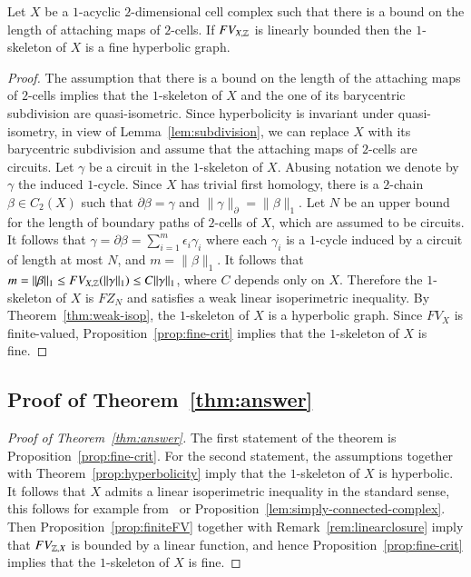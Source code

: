 \begin{corollary}\label{cor:suskey}
Let $X$ be a $1$-acyclic $2$-dimensional cell complex such that there is a bound on the length of  attaching maps of $2$-cells. If $FV_{X, \mathbb{Z}}$ is linearly bounded then the $1$-skeleton of $X$ is a fine hyperbolic graph.\end{corollary}
\begin{proof}
The assumption that there is a bound on the length of the attaching maps of $2$-cells implies that the $1$-skeleton of $X$ and the one of its barycentric subdivision are quasi-isometric. Since hyperbolicity is invariant under quasi-isometry, in view of Lemma~\ref{lem:subdivision},  we can replace $X$ with its  barycentric subdivision and assume that the attaching maps of $2$-cells are circuits.   Let $\gamma$ be a circuit in the $1$-skeleton of $X$. Abusing notation we denote by $\gamma$ the induced $1$-cycle.  Since $X$ has trivial first homology, there is a $2$-chain $\beta \in C_2(X)$ such that $\partial \beta =  \gamma$ and $\|\gamma\|_\partial = \|\beta\|_1$.  Let $N$ be an upper bound for the length of boundary paths of  $2$-cells of $X$, which are assumed to be circuits. It follows that $\gamma = \partial \beta = \sum_{i=1}^m \epsilon_i  \gamma_i$ where each $\gamma_i$ is a  $1$-cycle  induced by a circuit of length at most $N$, and $m=\|\beta\|_1$. It follows that 
$m=\|\beta\|_1 \leq FV_{X, \mathbb{Z}}(\|\gamma\|_1)\leq C \|\gamma\|_1$, 
where $C$ depends only on $X$. Therefore  the $1$-skeleton of $X$ is $FZ_N$ and satisfies a weak linear isoperimetric inequality. By Theorem~\ref{thm:weak-isop}, the  $1$-skeleton of $X$ is a hyperbolic graph.
Since $FV_X$ is finite-valued, Proposition~\ref{prop:fine-crit} implies that the $1$-skeleton of $X$ is fine.
\end{proof}





\subsection{Proof of  Theorem~\ref{thm:answer}}

\begin{proof}[Proof of Theorem~\ref{thm:answer}]
The first statement of the theorem is Proposition~\ref{prop:fine-crit}. 
For the second statement, the assumptions together with Theorem~\ref{prop:hyperbolicity} imply that the $1$-skeleton of $X$ is hyperbolic. It follows that $X$ admits a linear isoperimetric inequality in the standard sense, this follows for example from~\cite[Ch.III.H Proposition 2.2]{BrHa99} or Proposition~\ref{lem:simply-connected-complex}. Then Proposition~\ref{prop:finiteFV} together with Remark~\ref{rem:linearclosure} imply that $FV_{\mathbb{Z}, X}$ is bounded by a linear function, and hence Proposition~\ref{prop:fine-crit} implies that the $1$-skeleton of $X$ is fine. 
\end{proof}

